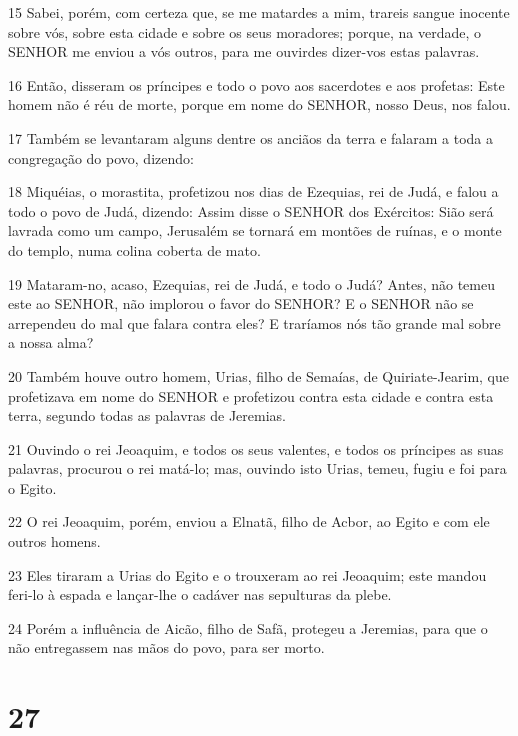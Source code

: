 \par 15 Sabei, porém, com certeza que, se me matardes a mim, trareis sangue inocente sobre vós, sobre esta cidade e sobre os seus moradores; porque, na verdade, o SENHOR me enviou a vós outros, para me ouvirdes dizer-vos estas palavras.
\par 16 Então, disseram os príncipes e todo o povo aos sacerdotes e aos profetas: Este homem não é réu de morte, porque em nome do SENHOR, nosso Deus, nos falou.
\par 17 Também se levantaram alguns dentre os anciãos da terra e falaram a toda a congregação do povo, dizendo:
\par 18 Miquéias, o morastita, profetizou nos dias de Ezequias, rei de Judá, e falou a todo o povo de Judá, dizendo: Assim disse o SENHOR dos Exércitos: Sião será lavrada como um campo, Jerusalém se tornará em montões de ruínas, e o monte do templo, numa colina coberta de mato.
\par 19 Mataram-no, acaso, Ezequias, rei de Judá, e todo o Judá? Antes, não temeu este ao SENHOR, não implorou o favor do SENHOR? E o SENHOR não se arrependeu do mal que falara contra eles? E traríamos nós tão grande mal sobre a nossa alma?
\par 20 Também houve outro homem, Urias, filho de Semaías, de Quiriate-Jearim, que profetizava em nome do SENHOR e profetizou contra esta cidade e contra esta terra, segundo todas as palavras de Jeremias.
\par 21 Ouvindo o rei Jeoaquim, e todos os seus valentes, e todos os príncipes as suas palavras, procurou o rei matá-lo; mas, ouvindo isto Urias, temeu, fugiu e foi para o Egito.
\par 22 O rei Jeoaquim, porém, enviou a Elnatã, filho de Acbor, ao Egito e com ele outros homens.
\par 23 Eles tiraram a Urias do Egito e o trouxeram ao rei Jeoaquim; este mandou feri-lo à espada e lançar-lhe o cadáver nas sepulturas da plebe.
\par 24 Porém a influência de Aicão, filho de Safã, protegeu a Jeremias, para que o não entregassem nas mãos do povo, para ser morto.

\chapter{27}

